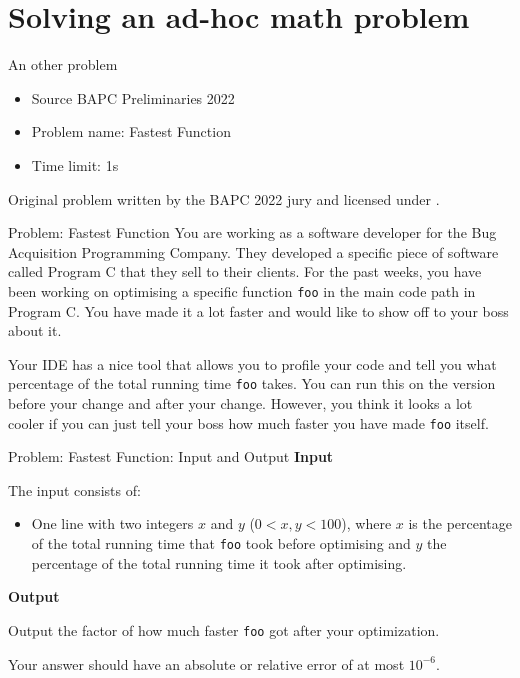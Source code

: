 \documentclass[11pt,pdf, aspectratio=169]{beamer}
\begin{document}
  \section{Solving an ad-hoc math problem}
  \begin{frame}{An other problem}
    \begin{itemize}
      \item Source BAPC Preliminaries 2022
      \item Problem name: Fastest Function
      \item Time limit: 1s
    \end{itemize}
    Original problem written by the BAPC 2022 jury and licensed under \doclicenseLongNameRef.

    \doclicenseImage

  \end{frame}
  \begin{frame}{Problem: Fastest Function}
    You are working as a software developer for the Bug Acquisition Programming Company.
    They developed a specific piece of software called Program C that they sell to their clients.
    For the past weeks, you have been working on optimising a specific function \texttt{foo} in the main code path in Program C.
    You have made it a lot faster and would like to show off to your boss about it.

    Your IDE has a nice tool that allows you to profile your code and tell you what percentage of the total running time \texttt{foo} takes.
    You can run this on the version before your change and after your change.
    However, you think it looks a lot cooler if you can just tell your boss how much faster you have made        \texttt{foo} itself.
  \end{frame}
  \begin{frame}{Problem: Fastest Function: Input and Output}
    \textbf{Input}

    The input consists of:
    \begin{itemize}
      \item One line with two integers $x$ and $y$ ($0 < x, y < 100$),
      where $x$ is the percentage of the total running time that \texttt{foo} took before optimising
      and $y$ the percentage of the total running time it took after optimising.
    \end{itemize}

    \textbf{Output}

    Output the factor of how much faster \texttt{foo} got after your optimization.

    Your answer should have an absolute or relative error of at most $10^{-6}$.
  \end{frame}
\end{document}
